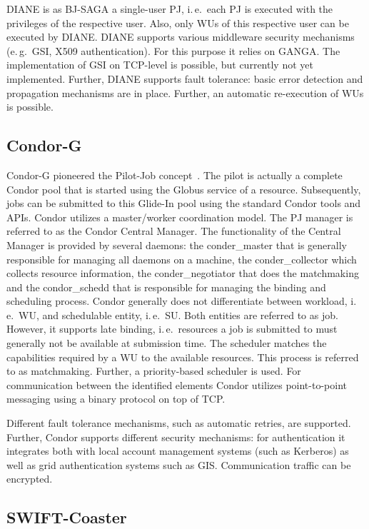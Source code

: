 \documentclass[conference,final]{IEEEtran}
\newcommand{\upp}{\vspace*{-0.5em}}
\begin{document}
DIANE is as BJ-SAGA a single-user PJ, i.\,e.\ each PJ is executed with the
privileges of the respective user. Also, only WUs of this respective user can be
executed by DIANE. DIANE supports various middleware security mechanisms
(e.\,g.\ GSI, X509 authentication). For this purpose it relies on GANGA. The
implementation of GSI on TCP-level is possible, but currently not yet
implemented. Further, DIANE supports fault tolerance: basic error detection and
propagation mechanisms are in place. Further, an automatic re-execution of WUs
is possible.

\upp
\subsection{Condor-G\upp\upp}

Condor-G pioneered the Pilot-Job concept~\cite{condor-g}. The pilot is
actually a complete Condor pool that is started using the Globus service of a
resource. Subsequently, jobs can be submitted to this Glide-In pool using the
standard Condor tools and APIs. Condor utilizes a master/worker coordination
model. The PJ manager is referred to as the Condor Central Manager. The
functionality of the Central Manager is provided by several daemons: the
conder\_master that is generally responsible for managing all daemons on a
machine, the conder\_collector which collects resource information, the
conder\_negotiator that does the matchmaking and the condor\_schedd that is
responsible for managing the binding and scheduling process. Condor generally
does not differentiate between workload, i.\,e.\ WU, and schedulable entity,
i.\,e.\ SU. Both entities are referred to as job. However, it supports late
binding, i.\,e.\ resources a job is submitted to must generally not be available
at submission time. The scheduler matches the capabilities required by a WU to
the available resources. This process is referred to as matchmaking. Further, a
priority-based scheduler is used. For communication between the identified
elements Condor utilizes point-to-point messaging using a binary protocol on top
of TCP.

Different fault tolerance mechanisms, such as automatic retries, are supported.
Further, Condor supports different security mechanisms: for authentication it
integrates both with local account management systems (such as Kerberos) as well
as grid authentication systems such as GIS. Communication traffic can be
encrypted.


\upp
\subsection{SWIFT-Coaster\upp\upp}
\end{document}
